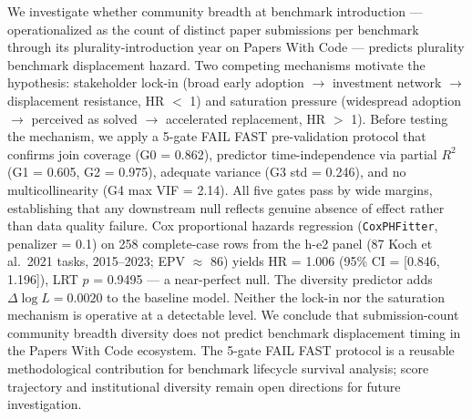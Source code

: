 We investigate whether community breadth at benchmark introduction --- operationalized as the count of distinct paper submissions per benchmark through its plurality-introduction year on Papers With Code --- predicts plurality benchmark displacement hazard. Two competing mechanisms motivate the hypothesis: stakeholder lock-in (broad early adoption $\to$ investment network $\to$ displacement resistance, HR $<$ 1) and saturation pressure (widespread adoption $\to$ perceived as solved $\to$ accelerated replacement, HR $>$ 1). Before testing the mechanism, we apply a 5-gate FAIL FAST pre-validation protocol that confirms join coverage (G0 = 0.862), predictor time-independence via partial $R^{2}$ (G1 = 0.605, G2 = 0.975), adequate variance (G3 std = 0.246), and no multicollinearity (G4 max VIF = 2.14). All five gates pass by wide margins, establishing that any downstream null reflects genuine absence of effect rather than data quality failure. Cox proportional hazards regression (\texttt{CoxPHFitter}, penalizer = 0.1) on 258 complete-case rows from the h-e2 panel (87 Koch et al.\ 2021 tasks, 2015--2023; EPV $\approx$ 86) yields HR = 1.006 (95\% CI = [0.846, 1.196]), LRT $p$ = 0.9495 --- a near-perfect null. The diversity predictor adds $\Delta\log L = 0.0020$ to the baseline model. Neither the lock-in nor the saturation mechanism is operative at a detectable level. We conclude that submission-count community breadth diversity does not predict benchmark displacement timing in the Papers With Code ecosystem. The 5-gate FAIL FAST protocol is a reusable methodological contribution for benchmark lifecycle survival analysis; score trajectory and institutional diversity remain open directions for future investigation.
